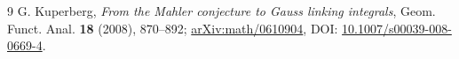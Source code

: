 \documentclass[11pt]{article}
\begin{document}
\begin{thebibliography}{9}
G. Kuperberg,
\emph{From the Mahler conjecture to Gauss linking integrals},
Geom. Funct. Anal. \textbf{18} (2008), 870--892;
\href{https://arxiv.org/abs/math/0610904}{arXiv:math/0610904},
DOI: \href{https://doi.org/10.1007/s00039-008-0669-4}
{10.1007/s00039-008-0669-4}.
\end{thebibliography}
\end{document}
